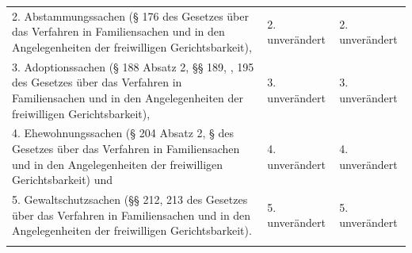 \documentclass[10pt,a4paper,landscape]{article}
\begin{document}
\begin{longtable}{|L{8.2cm}|L{8.2cm}|L{8.2cm}|}
\hhline{|---|}
2.  \newline Abstammungssachen (\S{} 176 des Gesetzes  \newline über das Verfahren in Familiensachen und  \newline in den Angelegenheiten der freiwilligen  \newline Gerichtsbarkeit), & 2. unverändert & 2. unverändert \\
\hhline{|---|}
3.  \newline Adoptionssachen (\S{} 188 Absatz 2, \S{}\S{} 189,  , 195 des Gesetzes über das Verfahren  \newline in Familiensachen und in den  \newline Angelegenheiten der freiwilligen  \newline Gerichtsbarkeit), & 3. unverändert & 3. unverändert \\
\hhline{|---|}
4.  \newline Ehewohnungssachen (\S{} 204 Absatz 2, \S{}   des Gesetzes über das Verfahren in  \newline Familiensachen und in den  \newline Angelegenheiten der freiwilligen  \newline Gerichtsbarkeit) und & 4. unverändert & 4. unverändert \\
\hhline{|---|}
5.  \newline Gewaltschutzsachen (\S{}\S{} 212, 213 des  \newline Gesetzes über das Verfahren in  \newline Familiensachen und in den  \newline Angelegenheiten der freiwilligen  \newline Gerichtsbarkeit). & 5. unverändert & 5. unverändert \\
\hhline{|---|}

\end{longtable}
\end{document}
